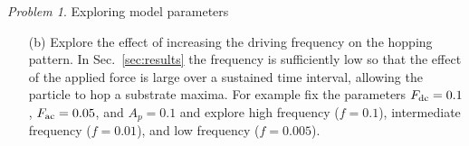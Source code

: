 \documentclass[preprint,showpacs,preprintnumbers,amsmath,amssymb,aps,prb]{revtex4-1}
\theoremstyle{remark}
\newtheorem{problem}{Problem}
\begin{document}
\begin{problem}{Exploring model parameters}
\begin{enumerate}


\item[(b)] Explore the effect of increasing the driving frequency on the hopping pattern. In Sec.~\ref{sec:results}
  the frequency is sufficiently low so that the effect of 
  the applied force is large
  over a sustained time interval,
  allowing the particle to hop a substrate maxima.
  For example fix
  the parameters
  $F_{\rm dc}=0.1$, $F_{\rm ac}=0.05$, and $A_p = 0.1$
  and explore
  high frequency 
  ($f = 0.1$),
  intermediate frequency 
  ($f = 0.01$),
  and low frequency
  ($f = 0.005$).

\end{enumerate}
\end{problem}
\end{document}
